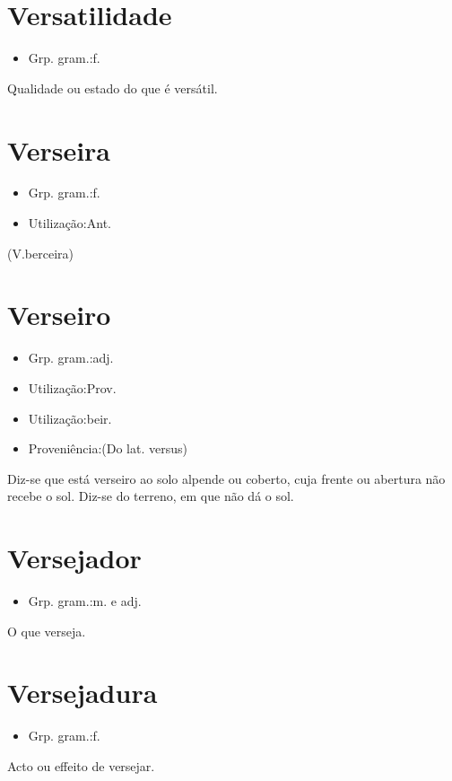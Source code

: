 \documentclass{article}
\begin{document}
\section{Versatilidade}
\begin{itemize}
\item {Grp. gram.:f.}
\end{itemize}
Qualidade ou estado do que é versátil.
\section{Verseira}
\begin{itemize}
\item {Grp. gram.:f.}
\end{itemize}
\begin{itemize}
\item {Utilização:Ant.}
\end{itemize}
(V.berceira)
\section{Verseiro}
\begin{itemize}
\item {Grp. gram.:adj.}
\end{itemize}
\begin{itemize}
\item {Utilização:Prov.}
\end{itemize}
\begin{itemize}
\item {Utilização:beir.}
\end{itemize}
\begin{itemize}
\item {Proveniência:(Do lat. \textunderscore versus\textunderscore )}
\end{itemize}
Diz-se que está \textunderscore verseiro ao sol\textunderscore  o alpende ou coberto, cuja frente ou abertura não recebe o sol.
Diz-se do terreno, em que não dá o sol.
\section{Versejador}
\begin{itemize}
\item {Grp. gram.:m.  e  adj.}
\end{itemize}
O que verseja.
\section{Versejadura}
\begin{itemize}
\item {Grp. gram.:f.}
\end{itemize}
Acto ou effeito de versejar.
\end{document}
